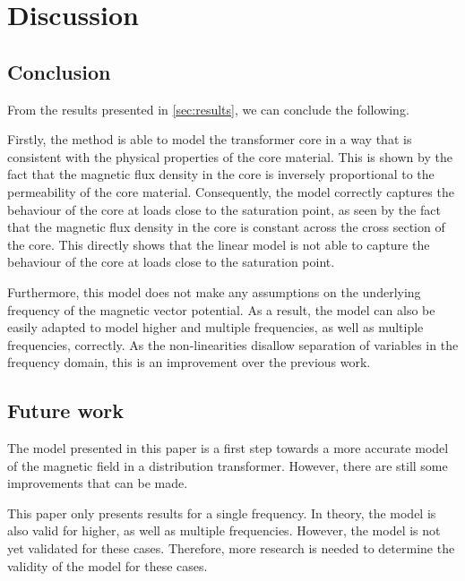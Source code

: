 \chapter{Discussion} \label{sec:discussion}


\section{Conclusion}
From the results presented in \autoref{sec:results}, we can conclude the following.

Firstly, the method is able to model the transformer core in a way that is consistent with the physical properties of the core material. This is shown by the fact that the magnetic flux density in the core is inversely proportional to the permeability of the core material. Consequently, the model correctly captures the behaviour of the core at loads close to the saturation point, as seen by the fact that the magnetic flux density in the core is constant across the cross section of the core. This directly shows that the linear model is not able to capture the behaviour of the core at loads close to the saturation point.

Furthermore, this model does not make any assumptions on the underlying frequency of the magnetic vector potential. As a result, the model can also be easily adapted to model higher and multiple frequencies, as well as multiple frequencies, correctly. As the non-linearities disallow separation of variables in the frequency domain, this is an improvement over the previous work.

\section{Future work}
The model presented in this paper is a first step towards a more accurate model of the magnetic field in a distribution transformer. However, there are still some improvements that can be made.
\vspace{5pt}

\noindent This paper only presents results for a single frequency. In theory, the model is also valid for higher, as well as multiple frequencies. However, the model is not yet validated for these cases. Therefore, more research is needed to determine the validity of the model for these cases.

